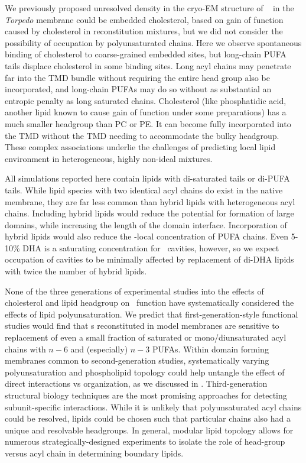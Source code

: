 We previously \citep{Brannigan2008} proposed unresolved density in the cryo-EM structure of \nachr~ in the {\it Torpedo} membrane could be embedded cholesterol, based on gain of function caused by cholesterol in reconstitution mixtures\citep{Fong1986,Sunshine1992,Hamouda2006,Butler1993,Bhushan1993,Fong1987,Bednarczyk_Transmembrane_2002,Corrie_Lipid_2002}, but we did not consider the possibility of occupation by polyunsaturated chains.  
Here we observe spontaneous binding of cholesterol to coarse-grained embedded sites, but long-chain PUFA tails displace cholesterol in some binding sites. Long acyl chains may penetrate far into the TMD bundle without requiring the entire head group also be incorporated, and long-chain PUFAs may do so without as substantial an entropic penalty as long saturated chains.  Cholesterol (like phosphatidic acid, another lipid known to cause gain of function under some preparations\citep{Butler1993,Bhushan1993,Fong1987,Bednarczyk2002,Corrie_Lipid_2002})  has a much smaller headgroup than PC or PE. It can become fully incorporated into the TMD without the TMD needing to accommodate the bulky headgroup.   These complex associations underlie the challenges of predicting local lipid environment in heterogeneous, highly non-ideal mixtures. 

All simulations reported here contain lipids with di-saturated tails or di-PUFA tails. While lipid species with two identical acyl chains do exist in the native membrane, they are far less common than hybrid lipids with heterogeneous acyl chains.  Including hybrid lipids would reduce the potential for formation of large domains, while increasing the length of the domain interface. 
Incorporation of hybrid lipids would also reduce the \nachr-local concentration of PUFA chains.  Even 5-10\% DHA is a saturating concentration for \nachr~cavities, however, so we expect occupation of cavities to be minimally affected by replacement of di-DHA lipids with twice the number of hybrid lipids. 

None of the three generations of experimental studies into the effects of cholesterol and lipid headgroup on \nachr~function have systematically considered the effects of lipid polyunsaturation. We predict that first-generation-style functional studies would find that \nachr s reconstituted in model membranes are sensitive to replacement of even a small fraction of saturated or mono/diunsaturated acyl chains with $n-6$ and (especially) $n-3$ PUFAs. Within domain forming membranes common to second-generation studies, systematically varying polyunsaturation and phospholipid topology could help untangle the effect of direct interactions vs organization, as we discussed in \citep{Brannigan2017}. Third-generation structural biology techniques are the most promising approaches for detecting subunit-specific interactions. While it is unlikely that polyunsaturated acyl chains could be resolved, lipids could be chosen such that particular chains also had a unique and resolvable headgroups. In general, modular lipid topology allows for numerous strategically-designed experiments to isolate the role of head-group versus acyl chain in determining boundary lipids. 
